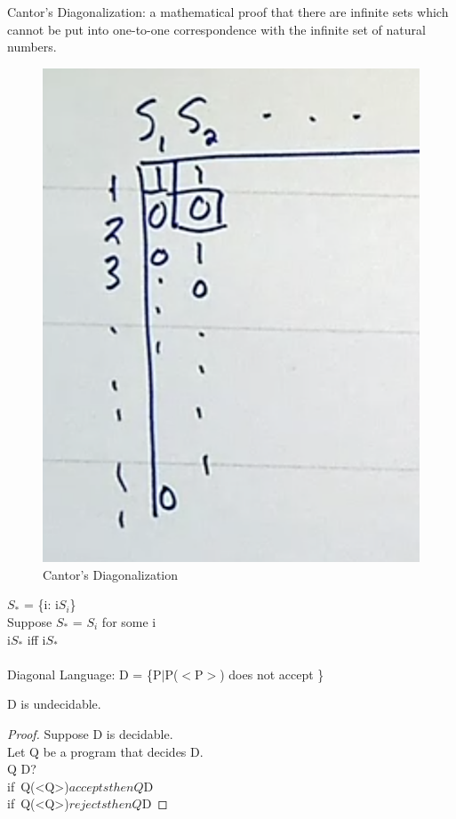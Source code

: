 \documentclass{article}
\begin{document}
Cantor's Diagonalization: a mathematical proof that there are infinite sets which cannot be put into one-to-one correspondence with the infinite set of natural numbers.
    \begin{figure}[h!]
		\begin{center}
			\includegraphics[scale=0.3]{fig2}
		\end{center}
		\caption{Cantor's Diagonalization}
	\end{figure}
	
$S_*$ = \{i: i\nsubseteq$S_i$\} \\
Suppose  $S_*$ = $S_i$ for some i \\
i\subseteq $S_*$ iff i\nsubseteq $S_*$ \Rightarrow \perp\\\\

Diagonal Language: D = \{P$|$P($<$P$>$) does not accept \}\\
\begin{theorem}
D is undecidable.
\end{theorem}
\begin{proof}
Suppose D is decidable.\\
Let Q be a program that decides D.\\
Q \in D?\\
if\ Q(<Q>)$ accepts then Q $\notin D\\
if\ Q(<Q>)$ rejects then Q $\in D
\end{proof}
\end{document}
